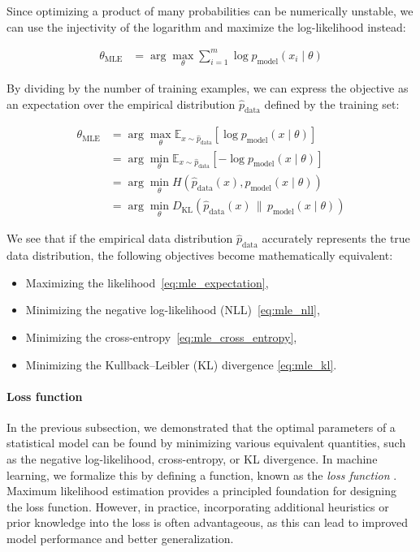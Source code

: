 Since optimizing a product of many probabilities can be numerically unstable, we can use the injectivity of the logarithm and maximize the log-likelihood instead:

\begin{align}
\theta_{\text{MLE}} 
&= \arg\max_{\theta} \sum_{i=1}^{m} \log p_{\text{model}}(x_i \mid \theta)
\end{align}

By dividing by the number of training examples, we can express the objective as an expectation over the empirical distribution $\hat{p}_{\text{data}}$ defined by the training set:

\begin{align}
\theta_{\text{MLE}} 
&= \arg\max_{\theta} \mathbb{E}_{x \sim \hat{p}_{\text{data}}} \left[ \log p_{\text{model}}(x \mid \theta) \right] \\
&= \arg\min_{\theta} \mathbb{E}_{x \sim \hat{p}_{\text{data}}} \left[- \log p_{\text{model}}(x \mid \theta) \right] \label{eq:mle_nll} \\
&= \arg\min_{\theta} H\left(\hat{p}_{\text{data}}(x), p_{\text{model}}(x \mid \theta) \right) \label{eq:mle_cross_entropy} \\
&= \arg\min_{\theta} D_{\text{KL}}\left(\hat{p}_{\text{data}}(x) \,\|\, p_{\text{model}}(x \mid \theta) \right) \label{eq:mle_kl}
\end{align}

We see that if the empirical data distribution $\hat{p}_{\text{data}}$ accurately represents the true data distribution, the following objectives become mathematically equivalent:
\begin{itemize}
    \item Maximizing the likelihood~\eqref{eq:mle_expectation},
    \item Minimizing the negative log-likelihood (NLL)~\eqref{eq:mle_nll},
    \item Minimizing the cross-entropy~\eqref{eq:mle_cross_entropy},
    \item Minimizing the Kullback–Leibler (KL) divergence \eqref{eq:mle_kl}.
\end{itemize}

\paragraph{Loss function}
In the previous subsection, we demonstrated that the optimal parameters of a statistical model can be found by minimizing various equivalent quantities, such as the negative log-likelihood, cross-entropy, or KL divergence. In machine learning, we formalize this by defining a function, known as the \emph{loss function} \cite{bengio2017deep}. Maximum likelihood estimation provides a principled foundation for designing the loss function. However, in practice, incorporating additional heuristics or prior knowledge into the loss is often advantageous, as this can lead to improved model performance and better generalization.

